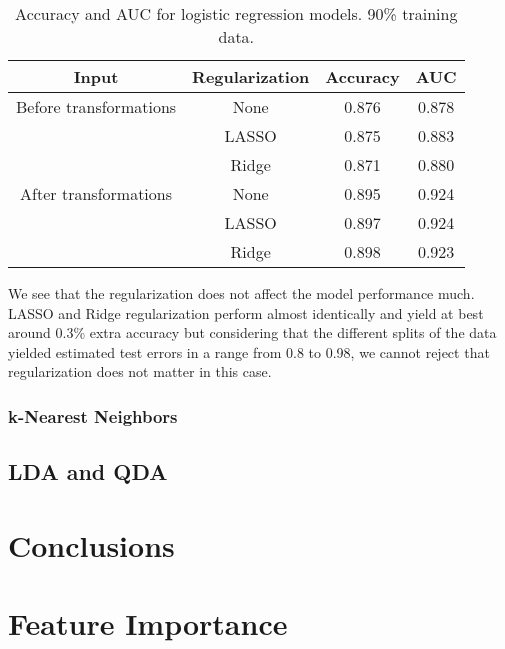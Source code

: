 \documentclass{article}
\begin{document}
\begin{table}[h!]
	\centering
	\begin{tabular}{cccc}
		Input & Regularization & Accuracy & AUC \\
		\midrule
		Before transformations & None & 0.876 & 0.878 \\
		& LASSO & 0.875 & 0.883 \\
		& Ridge & 0.871 & 0.880 \\
		\midrule
		After transformations & None & 0.895 & 0.924 \\
		& LASSO & 0.897 & 0.924 \\
		& Ridge & 0.898 & 0.923 \\
	\end{tabular}
	\caption{Accuracy and AUC for logistic regression models. 90\% training data.}
	\label{tab:logreg_table_90}
\end{table}

We see that the regularization does not affect the model performance much. LASSO and Ridge regularization perform almost identically and yield at best around 0.3\% extra accuracy but considering that the different splits of the data yielded estimated test errors in a range from 0.8 to 0.98, we cannot reject that regularization does not matter in this case.

\subsubsection{k-Nearest Neighbors}

\subsection{LDA and QDA}

\section{Conclusions}

\section{Feature Importance}
\end{document}
